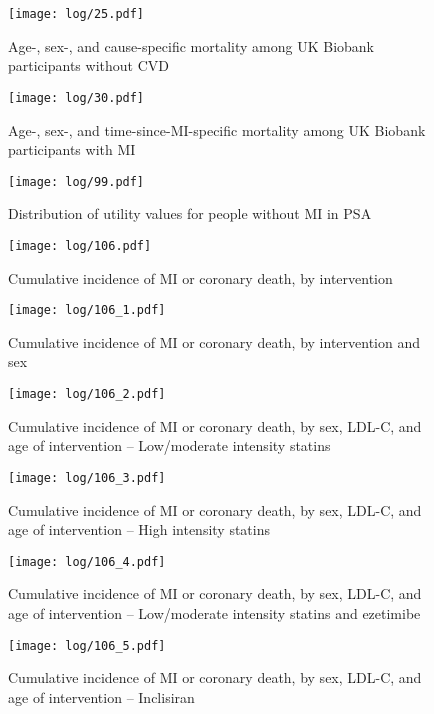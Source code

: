 \documentclass[11pt]{article}
\begin{document}
\begin{figure}
    \centering
    \texttt{[image: log/25.pdf]}
    \caption{Age-, sex-, and cause-specific mortality among UK Biobank participants without CVD}
    \label{NOCVDmort}
\end{figure}

\begin{figure}
    \centering
    \texttt{[image: log/30.pdf]}
    \caption{Age-, sex-, and time-since-MI-specific mortality among UK Biobank participants with MI}
    \label{PMImort}
\end{figure}

\begin{figure}
    \centering
    \texttt{[image: log/99.pdf]}
    \caption{Distribution of utility values for people without MI in PSA}
    \label{PSAFig4}
\end{figure}

\begin{figure}
    \centering
    \texttt{[image: log/106.pdf]}
    \caption{Cumulative incidence of MI or coronary death, by intervention}
    \label{PSArfig1}
\end{figure}
\begin{figure}
    \centering
    \texttt{[image: log/106\_1.pdf]}
    \caption{Cumulative incidence of MI or coronary death, by intervention and sex}
    \label{PSArfig2}
\end{figure}
\begin{figure}
    \centering
    \texttt{[image: log/106\_2.pdf]}
    \caption{Cumulative incidence of MI or coronary death, by sex, LDL-C, and age of intervention -- Low/moderate intensity statins}
    \label{PSArfig3}
\end{figure}
\begin{figure}
    \centering
    \texttt{[image: log/106\_3.pdf]}
    \caption{Cumulative incidence of MI or coronary death, by sex, LDL-C, and age of intervention -- High intensity statins}
    \label{PSArfig4}
\end{figure}
\begin{figure}
    \centering
    \texttt{[image: log/106\_4.pdf]}
    \caption{Cumulative incidence of MI or coronary death, by sex, LDL-C, and age of intervention -- Low/moderate intensity statins and ezetimibe}
    \label{PSArfig5}
\end{figure}
\begin{figure}
    \centering
    \texttt{[image: log/106\_5.pdf]}
    \caption{Cumulative incidence of MI or coronary death, by sex, LDL-C, and age of intervention -- Inclisiran}
    \label{PSArfig6}
\end{figure}
\end{document}
